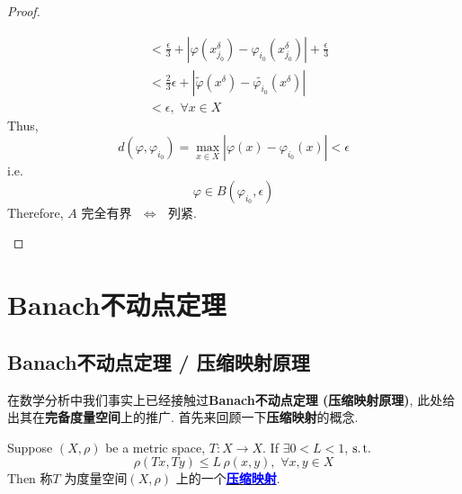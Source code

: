 \begin{thm}
\begin{proof}
\begin{enumerate}
\begin{align}
					&< \frac{\epsilon}{3} + \left| \varphi(x_{j_0}^\delta) - \varphi_{i_0}(x_{j_0}^\delta) \right| + \frac{\epsilon}{3} \\
					&< \frac{2}{3} \epsilon + \left| \widetilde{\varphi}(x^\delta) - \widetilde{\varphi_{i_0}}(x^\delta) \right| \\
					&< \epsilon , \,\, \forall x \in X
				\end{align}
				Thus, 
				\[ d(\varphi , \varphi_{i_0}) = \max_{x \in X} \left| \varphi(x) - \varphi_{i_0}(x) \right| < \epsilon \]
				i.e.
				\[ \varphi \in B(\varphi_{i_0} , \epsilon) \]
				Therefore, $A$ 完全有界 $\,\, \Leftrightarrow \,\,$ 列紧.
			\end{enumerate}
		\end{proof}
	\end{thm}

\newpage

\section{Banach不动点定理}
\subsection{Banach不动点定理 / 压缩映射原理}
	在数学分析中我们事实上已经接触过\textbf{Banach不动点定理 (压缩映射原理)}, 此处给出其在\textbf{完备度量空间}上的推广. 首先来回顾一下\textbf{压缩映射}的概念.
	
	\begin{defn}\label{def 1.9.1}
		Suppose $(X , \rho)$ be a metric space, $T : X \longrightarrow X$. If $\exists 0 < L <1$, $\operatorname{s.t.}$
		\[ \rho(Tx , Ty) \leq L \, \rho(x , y) , \,\, \forall x , y \in X \]
		Then 称$T$ 为度量空间$(X , \rho)$ 上的一个\underline{\textcolor{blue}{\textbf{压缩映射}}}.
	\end{defn}
	
	\vspace{6em}
	

